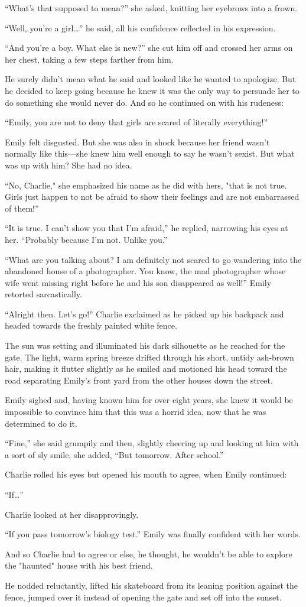 “What’s that supposed to mean?” she asked, knitting her eyebrows into a frown.

“Well, you’re a girl…” he said, all his confidence reflected in his expression.

“And you’re a boy. What else is new?” she cut him off and crossed her arms on her chest, taking a few steps farther from him.

He surely didn’t mean what he said and looked like he wanted to apologize. But he decided to keep going because he knew
it was the only way to persuade her to do something she would never do. And so he continued on with his rudeness:

“Emily, you are not to deny that girls are scared of literally everything!”

Emily felt disgusted. But she was also in shock because her friend wasn’t normally like this—she knew him well enough to say he wasn’t sexist.
But what was up with him? She had no idea.

“No, Charlie," she emphasized his name as he did with hers, "that is not true. Girls just happen to not be afraid to show their feelings and are not
embarrassed of them!”

“It is true. I can’t show you that I’m afraid,” he replied, narrowing his eyes at her. “Probably because I’m not. Unlike you.”

“What are you talking about? I am definitely not scared to go wandering into the abandoned house of a photographer. You know, the mad photographer
whose wife went missing right before he and his son disappeared as well!” Emily retorted sarcastically.

“Alright then. Let’s go!” Charlie exclaimed as he picked up his backpack and headed towards the freshly painted white fence.

The sun was setting and illuminated his dark silhouette as he reached for the gate. The light, warm spring breeze drifted
through his short, untidy ash-brown hair, making it flutter slightly as he smiled and motioned his head toward the road
separating Emily’s front yard from the other houses down the street.

Emily sighed and, having known him for over eight years, she knew it would be impossible to convince him that this was a horrid idea, now
that he was determined to do it.

“Fine,” she said grumpily and then, slightly cheering up and looking at him with a sort of sly smile, she added, “But tomorrow. After school.”

Charlie rolled his eyes but opened his mouth to agree, when Emily continued:

“If…”

Charlie looked at her disapprovingly.

“If you pass tomorrow’s biology test.” Emily was finally confident with her words.

And so Charlie had to agree or else, he thought, he wouldn’t be able to explore the "haunted" house with his best friend.

He nodded reluctantly, lifted his skateboard from its leaning position against the fence,
jumped over it instead of opening the gate and set off into the sunset.